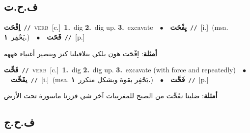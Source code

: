 \documentclass[10pt,a4paper,twoside]{article} %
\begin{document}
\begin{multicols}{2}
{{{{{{{{{{{{{\vspace{-3mm}
\subsection*{\color{blue}\foreignlanguage{arabic}{ف.ح.ت}\color{blue}{}} 

{\setlength\topsep{0pt}\textbf{\foreignlanguage{arabic}{اِفْحَت}}\ {\color{gray}\texttt{//}\color{black}}\ \textsc{verb}\ [c.]\ \textbf{1.}~dig  \textbf{2.}~dig up.  \textbf{3.}~excavate\ \ $\bullet$\ \ \setlength\topsep{0pt}\textbf{\foreignlanguage{arabic}{يِفْحَت}}\ {\color{gray}\texttt{//}\color{black}}\ [i.]\ \color{gray}(msa. \foreignlanguage{arabic}{يَحْفِر}~\foreignlanguage{arabic}{\textbf{١.}})\color{black}\ \ $\bullet$\ \ \setlength\topsep{0pt}\textbf{\foreignlanguage{arabic}{فَحَت}}\ {\color{gray}\texttt{//}\color{black}}\ [p.]\  \begin{flushright}\color{gray}\foreignlanguage{arabic}{\textbf{\underline{\foreignlanguage{arabic}{أمثلة}}}: اِفْحَت هون بلكي بنلاقيلنا كنز وبنصير أغنياء هههه}\end{flushright}\color{black}} \vspace{2mm}

{\setlength\topsep{0pt}\textbf{\foreignlanguage{arabic}{فَحِّت}}\ {\color{gray}\texttt{//}\color{black}}\ \textsc{verb}\ [c.]\ \textbf{1.}~dig  \textbf{2.}~dig up.  \textbf{3.}~excavate (with force and repeatedly)\ \ $\bullet$\ \ \setlength\topsep{0pt}\textbf{\foreignlanguage{arabic}{يفَحِّت}}\ {\color{gray}\texttt{//}\color{black}}\ [i.]\ \color{gray}(msa. \foreignlanguage{arabic}{يَحْفِر بقوة وبشكل متكرر}~\foreignlanguage{arabic}{\textbf{١.}})\color{black}\ \ $\bullet$\ \ \setlength\topsep{0pt}\textbf{\foreignlanguage{arabic}{فَحَّت}}\ {\color{gray}\texttt{//}\color{black}}\ [p.]\  \begin{flushright}\color{gray}\foreignlanguage{arabic}{\textbf{\underline{\foreignlanguage{arabic}{أمثلة}}}: ضلينا نفَحِّت من الصبح للمغربيات آخر شي فزرنا ماسورة تحت الأرض}\end{flushright}\color{black}} \vspace{2mm}

\vspace{-3mm}
\subsection*{\color{blue}\foreignlanguage{arabic}{ف.ح.ج}\color{blue}{}} 

}}}}}}}}}}}}}
\end{multicols}
\end{document}

